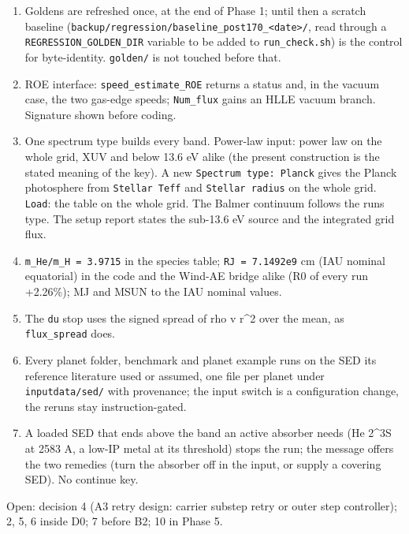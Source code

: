 \documentclass[english,a4paper]{my_memo}
\providecommand{\tightlist}{\setlength{\itemsep}{0pt}\setlength{\parskip}{0pt}}
\begin{document}
\begin{enumerate}
\def\labelenumi{\arabic{enumi}.}
\tightlist
\item
  Goldens are refreshed once, at the end of Phase 1; until then a scratch
  baseline (\texttt{backup/regression/baseline\_post170\_\textless{}date\textgreater{}/}, read through a
  \texttt{REGRESSION\_GOLDEN\_DIR} variable to be added to \texttt{run\_check.sh}) is the
  control for byte-identity. \texttt{golden/} is not touched before that.
\item
  ROE interface: \texttt{speed\_estimate\_ROE} returns a status and, in the vacuum
  case, the two gas-edge speeds; \texttt{Num\_flux} gains an HLLE vacuum branch.
  Signature shown before coding.
\item
  One spectrum type builds every band. Power-law input: power law on the
  whole grid, XUV and below 13.6 eV alike (the present construction is the
  stated meaning of the key). A new \texttt{Spectrum\ type:\ Planck} gives the
  Planck photosphere from \texttt{Stellar\ Teff} and \texttt{Stellar\ radius} on the whole
  grid. \texttt{Load}: the table on the whole grid. The Balmer continuum follows
  the run\textquotesingle s type. The setup report states the sub-13.6 eV source and the
  integrated grid flux.
\item
  \texttt{m\_He/m\_H\ =\ 3.9715} in the species table; \texttt{RJ\ =\ 7.1492e9} cm (IAU
  nominal equatorial) in the code and the Wind-AE bridge alike (R0 of every
  run +2.26\%); MJ and MSUN to the IAU nominal values.
\item
  The \texttt{du} stop uses the signed spread of rho v r\^{}2 over the mean, as
  \texttt{flux\_spread} does.
\item
  Every planet folder, benchmark and planet example runs on the SED its
  reference literature used or assumed, one file per planet under
  \texttt{inputdata/sed/} with provenance; the input switch is a configuration
  change, the reruns stay instruction-gated.
\item
  A loaded SED that ends above the band an active absorber needs (He 2\^{}3S
  at 2583 A, a low-IP metal at its threshold) stops the run; the message
  offers the two remedies (turn the absorber off in the input, or supply a
  covering SED). No continue key.
\end{enumerate}

Open: decision 4 (A3 retry design: carrier substep retry or outer step
controller); 2, 5, 6 inside D0; 7 before B2; 10 in Phase 5.
\end{document}
